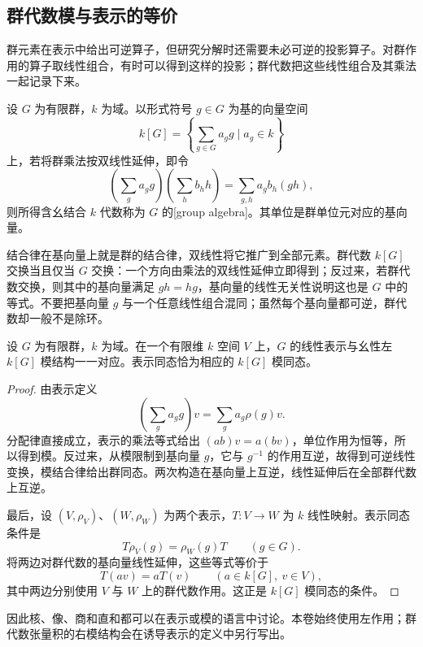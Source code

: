 \subsection{群代数模与表示的等价}
\label{b5:subsec:0101:02}

群元素在表示中给出可逆算子，但研究分解时还需要未必可逆的投影算子。对群作用的算子取线性组合，有时可以得到这样的投影；群代数把这些线性组合及其乘法一起记录下来。

\begin{definition}\label{b5:def:group-algebra}
	设 \(G\) 为有限群，\(k\) 为域。以形式符号 \(g\in G\) 为基的向量空间
	\[
		k[G]=\left\{\sum_{g\in G}a_gg\mid a_g\in k\right\}
	\]
	上，若将群乘法按双线性延伸，即令
	\[
		\left(\sum_g a_gg\right)\left(\sum_h b_hh\right) =\sum_{g,h}a_gb_h(gh),
	\]
	则所得含幺结合 \(k\) 代数称为 \(G\) 的[group algebra]。其单位是群单位元对应的基向量。
\end{definition}

结合律在基向量上就是群的结合律，双线性将它推广到全部元素。群代数 \(k[G]\) 交换当且仅当 \(G\) 交换：一个方向由乘法的双线性延伸立即得到；反过来，若群代数交换，则其中的基向量满足 \(gh=hg\)，基向量的线性无关性说明这也是 \(G\) 中的等式。不要把基向量 \(g\) 与一个任意线性组合混同；虽然每个基向量都可逆，群代数却一般不是除环。

\begin{proposition}\label{b5:prop:representations-group-modules}
	设 \(G\) 为有限群，\(k\) 为域。在一个有限维 \(k\) 空间 \(V\) 上，\(G\) 的线性表示与幺性左 \(k[G]\) 模结构一一对应。表示同态恰为相应的 \(k[G]\) 模同态。
\end{proposition}
\begin{proof}
	由表示定义
	\[
		\left(\sum_ga_gg\right)v=\sum_ga_g\rho(g)v.
	\]
	分配律直接成立，表示的乘法等式给出 \((ab)v=a(bv)\)，单位作用为恒等，所以得到模。反过来，从模限制到基向量 \(g\)，它与 \(g^{-1}\) 的作用互逆，故得到可逆线性变换，模结合律给出群同态。两次构造在基向量上互逆，线性延伸后在全部群代数上互逆。

	最后，设 \((V,\rho_V)\)、\((W,\rho_W)\) 为两个表示，\(T:V\to W\) 为 \(k\) 线性映射。表示同态条件是
	\[
		T\rho_V(g)=\rho_W(g)T\qquad(g\in G).
	\]
	将两边对群代数的基向量线性延伸，这些等式等价于
	\[
		T(av)=aT(v)\qquad(a\in k[G],\ v\in V),
	\]
	其中两边分别使用 \(V\) 与 \(W\) 上的群代数作用。这正是 \(k[G]\) 模同态的条件。
\end{proof}

因此核、像、商和直和都可以在表示或模的语言中讨论。本卷始终使用左作用；群代数张量积的右模结构会在诱导表示的定义中另行写出。

